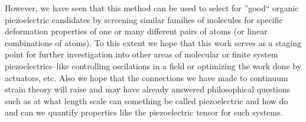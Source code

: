 However, we have seen that this method can be used to select for ''good`` organic piezoelectric candidates by screening similar families of molecules for specific deformation properties
of one or many different pairs of atoms (or linear combinations of atoms). 
To this extent we hope that this work serves as a staging point for further investigation into other areas of molecular or finite system piezoelectrics--like controlling oscilations in a field
or optimizing the work done by actuators, etc.  
Also we hope that the connections we have made to continuum strain theory will raise and may have already answered philosophical questions such as at what length scale can something be called 
piezoelectric and how do  and can we quantify properties like the piezoelectric tensor for such systems.

